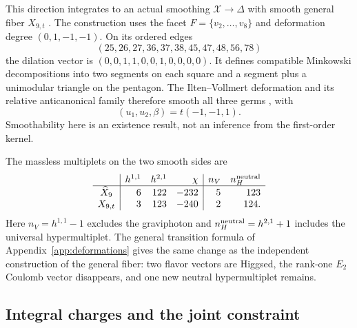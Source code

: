 This direction integrates to an actual smoothing
$\mathcal X\to\Delta$ with smooth general fiber $X_{9,t}$
\cite[Theorem~B]{Wuebben:2026smoothing}. The construction uses the
facet $F=\{v_2,\ldots,v_8\}$ and deformation degree $(0,1,-1,-1)$.
On its ordered edges
\begin{equation}
 (25,26,27,36,37,38,45,47,48,56,78)
 \label{eq:x9-facet-edges}
\end{equation}
the dilation vector is $(0,0,1,1,0,0,1,0,0,0,0)$. It defines
compatible Minkowski decompositions into two segments on each square
and a segment plus a unimodular triangle on the pentagon. The
Ilten--Vollmert deformation and its relative anticanonical family
therefore smooth all three germs
\cite{Altmann:1995,Ilten:2012,Wuebben:2026smoothing}, with
\begin{equation}
 (u_1,u_2,\beta)=t(-1,-1,1).
 \label{eq:x9-family-direction}
\end{equation}
Smoothability here is an existence result, not an inference from
the first-order kernel.

The massless multiplets on the two smooth sides are
\begin{equation}
\begin{array}{c|rrr|rr}
 &h^{1,1}&h^{2,1}&\chi&n_V&n_H^{\rm neutral}\\\hline
 \widehat X_9&6&122&-232&5&123\\
 X_{9,t}&3&123&-240&2&124 .
\end{array}
\label{eq:x9-spectrum-table}
\end{equation}
Here $n_V=h^{1,1}-1$ excludes the graviphoton and
$n_H^{\rm neutral}=h^{2,1}+1$ includes the universal hypermultiplet.
The general transition formula of Appendix~\ref{app:deformations}
gives the same change as the independent construction of the general
fiber: two flavor vectors are Higgsed, the rank-one $E_2$ Coulomb
vector disappears, and one new neutral hypermultiplet remains.

\subsection{Integral charges and the joint constraint}

